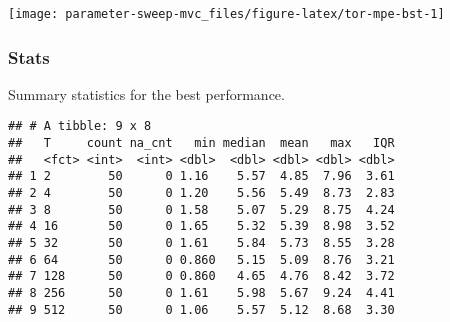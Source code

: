 \documentclass[]{book}
\newenvironment{Shaded}{\begin{snugshade}}{\end{snugshade}}
\newcommand{\DataTypeTok}[1]{\textcolor[rgb]{0.13,0.29,0.53}{#1}}
\newcommand{\KeywordTok}[1]{\textcolor[rgb]{0.13,0.29,0.53}{\textbf{#1}}}
\newcommand{\NormalTok}[1]{#1}
\newcommand{\OperatorTok}[1]{\textcolor[rgb]{0.81,0.36,0.00}{\textbf{#1}}}
\newcommand{\OtherTok}[1]{\textcolor[rgb]{0.56,0.35,0.01}{#1}}
\newcommand{\StringTok}[1]{\textcolor[rgb]{0.31,0.60,0.02}{#1}}
\begin{document}
\texttt{[image: parameter-sweep-mvc\_files/figure-latex/tor-mpe-bst-1]}

\hypertarget{stats-18}{%
\subsubsection{Stats}\label{stats-18}}

Summary statistics for the best performance.

\begin{Shaded}
\end{Shaded}

\begin{verbatim}
## # A tibble: 9 x 8
##   T     count na_cnt   min median  mean   max   IQR
##   <fct> <int>  <int> <dbl>  <dbl> <dbl> <dbl> <dbl>
## 1 2        50      0 1.16    5.57  4.85  7.96  3.61
## 2 4        50      0 1.20    5.56  5.49  8.73  2.83
## 3 8        50      0 1.58    5.07  5.29  8.75  4.24
## 4 16       50      0 1.65    5.32  5.39  8.98  3.52
## 5 32       50      0 1.61    5.84  5.73  8.55  3.28
## 6 64       50      0 0.860   5.15  5.09  8.76  3.21
## 7 128      50      0 0.860   4.65  4.76  8.42  3.72
## 8 256      50      0 1.61    5.98  5.67  9.24  4.41
## 9 512      50      0 1.06    5.57  5.12  8.68  3.30
\end{verbatim}
\end{document}
